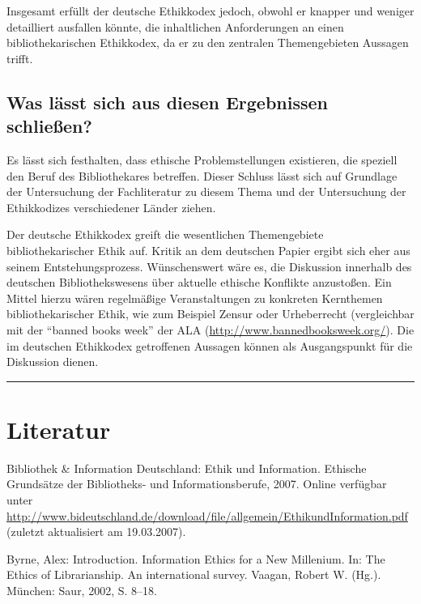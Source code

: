 \documentclass[output=paper]{langscibook}
\begin{document}
Insgesamt erfüllt der deutsche Ethikkodex jedoch, obwohl er knapper und
weniger detailliert ausfallen könnte, die inhaltlichen Anforderungen an
einen bibliothekarischen Ethikkodex, da er zu den zentralen
Themengebieten Aussagen trifft.

\hypertarget{was-luxe4sst-sich-aus-diesen-ergebnissen-schlieuxdfen}{%
\subsection*{Was lässt sich aus diesen Ergebnissen
schließen?}\label{was-luxe4sst-sich-aus-diesen-ergebnissen-schlieuxdfen}}

Es lässt sich festhalten, dass ethische Problemstellungen existieren,
die speziell den Beruf des Bibliothekares betreffen. Dieser Schluss
lässt sich auf Grundlage der Untersuchung der Fachliteratur zu diesem
Thema und der Untersuchung der Ethikkodizes verschiedener Länder ziehen.

Der deutsche Ethikkodex greift die wesentlichen Themengebiete
bibliothekarischer Ethik auf. Kritik an dem deutschen Papier ergibt sich
eher aus seinem Entstehungsprozess. Wünschenswert wäre es, die
Diskussion innerhalb des deutschen Bibliothekswesens über aktuelle
ethische Konflikte anzustoßen. Ein Mittel hierzu wären regelmäßige
Veranstaltungen zu konkreten Kernthemen bibliothekarischer Ethik, wie
zum Beispiel Zensur oder Urheberrecht (vergleichbar mit der
\enquote{banned books week} der ALA
(\url{http://www.bannedbooksweek.org/}). Die im deutschen Ethikkodex
getroffenen Aussagen können als Ausgangspunkt für die Diskussion dienen.

\begin{center}\rule{0.5\linewidth}{0.5pt}\end{center}

\hypertarget{literatur}{%
\section*{Literatur}\label{literatur}}

Bibliothek \& Information Deutschland: Ethik und Information. Ethische
Grundsätze der Bibliotheks- und Informationsberufe, 2007. Online
verfügbar unter
\url{http://www.bideutschland.de/download/file/allgemein/EthikundInformation.pdf}
(zuletzt aktualisiert am 19.03.2007).

Byrne, Alex: Introduction. Information Ethics for a New Millenium. In:
The Ethics of Librarianship. An international survey. Vaagan, Robert W.
(Hg.). München: Saur, 2002, S. 8--18.
\end{document}
